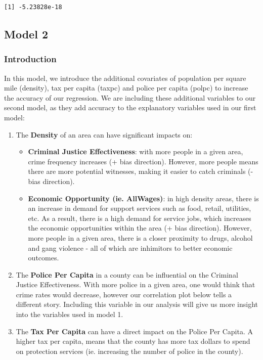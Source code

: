 \documentclass[]{article}
\providecommand{\tightlist}{%
  \setlength{\itemsep}{0pt}\setlength{\parskip}{0pt}}
\begin{document}
\begin{verbatim}
[1] -5.23828e-18
\end{verbatim}

\hypertarget{model-2}{%
\subsection{Model 2}\label{model-2}}

\hypertarget{introduction-2}{%
\subsubsection{Introduction}\label{introduction-2}}

In this model, we introduce the additional covariates of population per
square mile (density), tax per capita (taxpc) and police per capita
(polpc) to increase the accuracy of our regression. We are including
these additional variables to our second model, as they add accuracy to
the explanatory variables used in our first model:

\begin{enumerate}
\def\labelenumi{\arabic{enumi}.}
\tightlist
\item
  The \textbf{Density} of an area can have significant impacts on:

  \begin{itemize}
  \tightlist
  \item
    \textbf{Criminal Justice Effectiveness}: with more people in a given
    area, crime frequency increases (+ bias direction). However, more
    people means there are more potential witnesses, making it easier to
    catch criminals (- bias direction).
  \item
    \textbf{Economic Opportunity (ie. AllWages)}: in high density areas,
    there is an increase in demand for support services such as food,
    retail, utilities, etc. As a result, there is a high demand for
    service jobs, which increases the economic opportunities within the
    area (+ bias direction). However, more people in a given area, there
    is a closer proximity to drugs, alcohol and gang violence - all of
    which are inhimitors to better economic outcomes.
  \end{itemize}
\item
  The \textbf{Police Per Capita} in a county can be influential on the
  Criminal Justice Effectiveness. With more police in a given area, one
  would think that crime rates would decrease, however our correlation
  plot below tells a different story. Including this variable in our
  analysis will give us more insight into the variables used in model 1.
\item
  The \textbf{Tax Per Capita} can have a direct impact on the Police Per
  Capita. A higher tax per capita, means that the county has more tax
  dollars to spend on protection services (ie. increasing the number of
  police in the county).
\end{enumerate}
\end{document}
